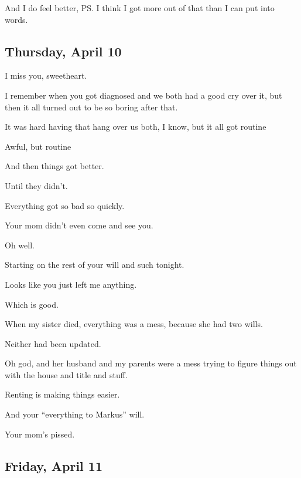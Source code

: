 {
And I do feel better, PS. I think I
got more out of that than I can put into words.

\newpage

\subsection*{Thursday, April 10}\label{thursday-april-10}

I miss you, sweetheart.

I remember when you got diagnosed
and we both had a good cry over it, but then it all turned out to be so
boring after that.

It was hard having that hang over us
both, I know, but it all got routine

Awful, but routine

And then things got better.

Until they didn't.

Everything got so bad so quickly.

Your mom didn't even come and see
you.

Oh well.

Starting on the rest of your will
and such tonight.

Looks like you just left me
anything.

Which is good.

When my sister died, everything was
a mess, because she had two wills.

Neither had been updated.

Oh god, and her husband and my
parents were a mess trying to figure things out with the house and title
and stuff.

Renting is making things easier.

And your ``everything to Markus''
will.

Your mom's pissed.

\newpage

\subsection*{Friday, April 11}\label{friday-april-11}

}
